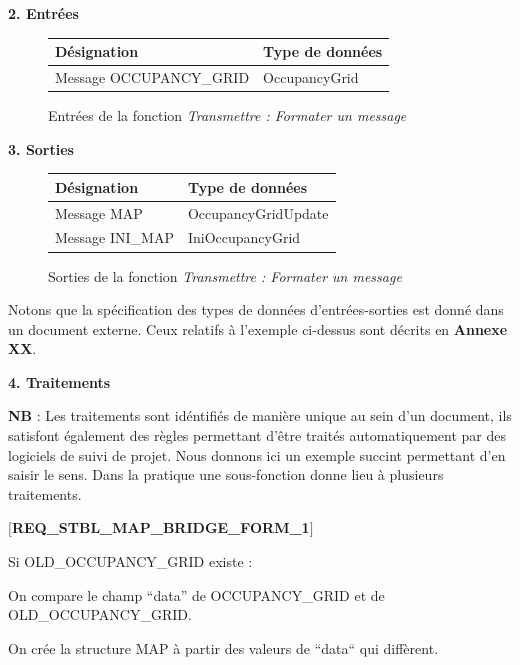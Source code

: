   \textbf{2. Entrées }
  \begin{figure}[!h]
    \begin{center}
      \begin{tabular}{|l|l|}
	\hline
	\textbf{Désignation} & \textbf{Type de données} \\
	\hline
	Message OCCUPANCY\_GRID & OccupancyGrid \\
	\hline
      \end{tabular}
    \end{center}
    \caption{Entrées de la fonction \emph{Transmettre : Formater un message}}
  \end{figure}
  
  \textbf{3. Sorties }
  \begin{figure}[!h]
    \begin{center}
      \begin{tabular}{|l|l|}
	\hline
	\textbf{Désignation} & \textbf{Type de données} \\
	\hline
	Message MAP & OccupancyGridUpdate \\
	Message INI\_MAP & IniOccupancyGrid \\
	\hline
      \end{tabular}
    \end{center}
    \caption{Sorties de la fonction \emph{Transmettre : Formater un message}}
  \end{figure}
  
  Notons que la spécification des types de données d'entrées-sorties est donné dans un document externe. Ceux relatifs à l'exemple ci-dessus sont décrits en \textbf{Annexe XX}.  
  
  \textbf{4. Traitements }
  
  \textbf{NB} : Les traitements sont idéntifiés de manière unique au sein d'un document, ils satisfont également des règles permettant d'être traités automatiquement par des logiciels de suivi de projet. 
  Nous donnons ici un exemple succint permettant d'en saisir le sens. Dans la pratique une sous-fonction donne lieu à plusieurs traitements.
  
  \textbf{$[$REQ\_STBL\_MAP\_BRIDGE\_FORM\_1$]$}
  
    \hspace{10mm} Si OLD\_OCCUPANCY\_GRID existe : 
    
    \hspace{10mm} On compare le champ ``data'' de OCCUPANCY\_GRID et de OLD\_OCCUPANCY\_GRID. 
    
    \hspace{10mm} On crée la structure MAP à partir des valeurs de ``data`` qui diffèrent. 
    
